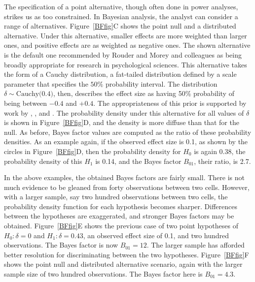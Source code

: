 \documentclass[man]{apa6}
\begin{document}
The specification of a point alternative, though often done in power analyses, strikes us as too constrained.  In Bayesian analysis, the analyst can consider a range of alternatives.  Figure~\ref{BFfig}C shows the point null and a distributed alternative.  Under this alternative, smaller effects are more weighted than larger ones, and positive effects are as weighted as negative ones.  The shown alternative is the default one recommended by Rouder and Morey and colleagues \citep{Rouder:etal:2009a,Morey:Rouder:2011,Rouder:Morey:2012,Rouder:etal:2012} as being broadly appropriate for research in psychological sciences. This alternative takes the form of a Cauchy distribution, a fat-tailed distribution defined by a scale parameter that specifies the $50\%$ probability interval. The distribution $\delta \sim \mbox{Cauchy(0.4)}$, then, describes the effect size as having 50\% probability of being between $-0.4$ and $+0.4$. 
The appropriateness of this prior is supported by work by \citet{Jeffreys:1961}, \citet{Liang:etal:2008}, and \citet{Zellner:Siow:1980}. 
The probability density under this alternative for all values of $\hat{\delta}$ is shown in Figure~\ref{BFfig}D, and the density is more diffuse than that for the null. As before, Bayes factor values are computed as the ratio of these probability densities. As an example again, if the observed effect size is 0.1, as shown by the circles in Figure~\ref{BFfig}D, then the probability density for $H_0$ is again 0.38, the probability density of this $H_1$ is 0.14, and the Bayes factor $B_{01}$, their ratio, is 2.7.

In the above examples, the obtained Bayes factors are fairly small. There is not much evidence to be gleaned from forty observations between two cells. However, with a larger sample, say two hundred observations between two cells, the probability density function for each hypothesis becomes sharper. Differences between the hypotheses are exaggerated, and stronger Bayes factors may be obtained. Figure~\ref{BFfig}E shows the previous case of two point hypotheses of $H_0: \delta = 0$ and $H_1: \delta = 0.43$, an observed effect size of 0.1, and two hundred observations. The Bayes factor is now $B_{01} = 12$. The larger sample has afforded better resolution for discriminating between the two hypotheses. Figure~\ref{BFfig}F shows the point null and distributed alternative scenario, again with the larger sample size of two hundred observations. The Bayes factor here is $B_{01} = 4.3$.
\end{document}
